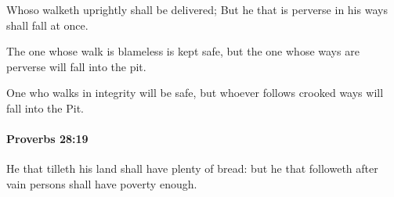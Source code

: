 			\begin{versebox}
					\item[BHS] 
					\item[ASV] Whoso walketh uprightly shall be delivered; But he that is perverse in his ways shall fall at once.
					\item[NIV] The one whose walk is blameless is kept safe, but the one whose ways are perverse will fall into the pit.
					\item[NRSV] One who walks in integrity will be safe, but whoever follows crooked ways will fall into the Pit.
			\end{versebox}

		\paragraph{Proverbs 28:19} %
			\label{PROVERBS-28-19}

			He that tilleth his land shall have plenty of bread: but he that followeth after vain persons shall have poverty enough.


